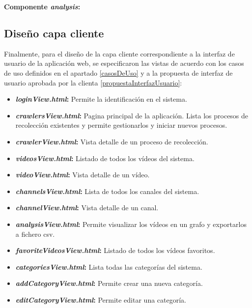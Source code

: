 \documentclass[11pt,a4paper]{article}
\begin{document}
\noindent\textbf{Componente \textit{analysis}:}
\begin{table}[H]
\centering
{}
\caption{Componente \textit{analysis} API}
\end{table}

\medskip 

\subsection{Diseño capa cliente}
Finalmente, para el diseño de la capa cliente correspondiente a la interfaz de usuario de la aplicación web, se especificaron las vistas de acuerdo con los casos de uso definidos en el apartado \ref{casosDeUso} y a la propuesta de interfaz de usuario aprobada por la clienta \ref{propuestaInterfazUsuario}:
\\

\begin{itemize}
\item \textbf{\textit{loginView.html}:} Permite la identificación en el sistema.
\item \textbf{\textit{crawlersView.html}:} Pagina principal de la aplicación. Lista los procesos de recolección existentes y permite gestionarlos y iniciar nuevos procesos.
\item \textbf{\textit{crawlerView.html}:} Vista detalle de un proceso de recolección.
\item \textbf{\textit{videosView.html}:} Listado de todos los vídeos del sistema.
\item \textbf{\textit{videoView.html}:} Vista detalle de un vídeo.
\item \textbf{\textit{channelsView.html}:} Lista de todos los canales del sistema.
\item \textbf{\textit{channelView.html}:} Vista detalle de un canal.
\item \textbf{\textit{analysisView.html}:} Permite visualizar los vídeos en un grafo y exportarlos a fichero csv.
\item \textbf{\textit{favoriteVideosView.html}:} Listado de todos los vídeos favoritos.
\item \textbf{\textit{categoriesView.html}:} Lista todas las categorías del sistema.
\item \textbf{\textit{addCategoryView.html}:} Permite crear una nueva categoría.
\item \textbf{\textit{editCategoryView.html}:} Permite editar una categoría.
\end{itemize}
\end{document}
